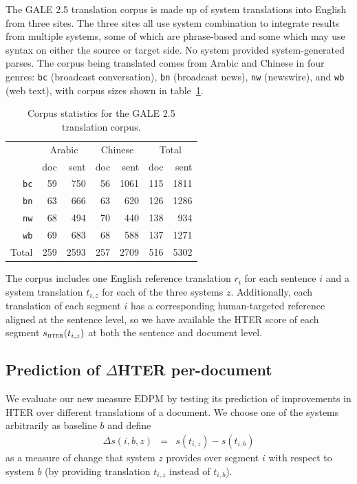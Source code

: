 \documentclass[11pt]{article}
\newcommand{\myEDPM}[0]{\ensuremath{\mathrm{EDPM}}}
\begin{document}
The GALE 2.5 translation corpus is made up of system translations into
English from three sites.
The three sites all use system combination to integrate results from
multiple systems, some of which are phrase-based and some which may
use syntax on either the source or target side. No system provided
system-generated parses.
%
The corpus being translated comes from
Arabic and Chinese in four genres: \texttt{bc} (broadcast
conversation), \texttt{bn} (broadcast news), \texttt{nw} (newswire),
and \texttt{wb} (web text), with corpus sizes shown in
table~\ref{tab:galestats}.
\begin{table}
  \centering
  \begin{tabular}{r|rr|rr|rr}
     & \multicolumn{2}{c|}{Arabic} & \multicolumn{2}{c|}{Chinese}
     & \multicolumn{2}{c}{Total}\\
     & doc & sent & doc & sent & doc   & sent\\
     \hline
     \texttt{bc}    & 59  & 750 & 56 & 1061 & 115 & 1811\\
     \texttt{bn}    & 63  & 666 & 63 & 620  & 126 & 1286\\
     \texttt{nw}    & 68  & 494 & 70 & 440  & 138 & 934 \\
     \texttt{wb}    & 69  & 683 & 68 & 588  & 137 & 1271\\
     \hline
     Total & 259 & 2593& 257& 2709 & 516 & 5302\\
  \end{tabular}
  \caption{Corpus statistics for the GALE 2.5 translation
    corpus.}
  \label{tab:galestats}
\end{table}
The corpus includes one English reference translation $r_i$
\cite{gale08phase2_5references} for each sentence $i$ and a system
translation $t_{i,z}$ for each of the three systems $z$. Additionally,
each translation of each segment $i$ has a corresponding
human-targeted reference aligned at the sentence level, so we have
available the HTER score of each segment $s_{\textsc{hter}}(t_{i,z})$
at both the sentence and document level.

\subsection{Prediction of $\Delta$HTER per-document}

We evaluate our new measure \myEDPM{} by testing its prediction of
improvements in HTER over different translations of a document.  We
choose one of the systems arbitrarily as baseline $b$ and
define
\begin{eqnarray}
  \label{eq:delta}
  \Delta s(i,b,z) & = & s(t_{i,z}) - s(t_{i,b})
\end{eqnarray}
as a measure of change %
that system $z$ provides over segment $i$ with respect to system $b$
(by providing translation $t_{i,z}$ instead of $t_{i,b}$).
\end{document}
